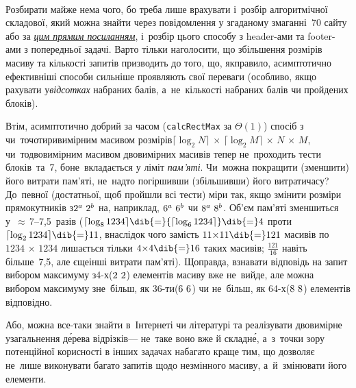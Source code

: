 ~

\smallskip

\vspace{-\baselineskip}

\Tutorial
Розбирати майже нема чого, бо треба лише врахувати і~розбір алгоритмічної складової, який можна знайти через повідомлення у згаданому змаганні~70 сайту \EjudgeCkipoName{} або за \href{https://ejudge.ckipo.edu.ua/coll_new_A4_11pt.pdf#page=110}{\emph{цим прямим посиланням}}, і~розбір цього способу з header-ами та footer-ами з попередньої задачі.
Варто тільки наголосити, що збільшення розмірів масиву та кількості запитів призводить до того, що, як\nolinebreak[3] правило, асимптотично ефективніші способи сильніше проявляють свої переваги (особливо, якщо рахувати у\nolinebreak[2] \emph{відсотках} набраних балів, а~не~кількості набраних балів чи пройдених блоків).

Втім, асимптотично добрий за часом (\texttt{calcRectMax} за $\Theta(1)$) спосіб з чи~то\nolinebreak[2] чотиривимірним масивом розмірів\nolinebreak[2] ${\lceil\log_2{N}\rceil\,{\times}\,\lceil\log_2{M}\rceil\,{\times}\,N\,{\times}\,M}$, чи~то\nolinebreak[2] двовимірним масивом двовимірних масивів тепер не~проходить тести блоків~та~7, бо\nolinebreak[3] не~вкладається у ліміт \emph{пам'яті}. Чи~можна покращити (зменшити) його витрати пам'яті, не~надто погіршивши (збільшивши) його витрати\nolinebreak[2] часу? До~певної (достатньої, щоб пройшли всі тести) міри так, якщо змінити розміри прямокутників з\nolinebreak[2] ${2^a\,{\*}\,2^b}$ на, наприклад, ${6^a\,{\*}\,6^b}$ чи ${8^a\,{\*}\,8^b}$. 
Об'єм пам'яті зменшиться у~${\approx}\,$\mbox{7--7,5}~разів 
(${\lceil\log_8{1234}\rceil}\dib{{=}}{\lceil\log_6{1234}\rceil}\dib{{=}}4$ проти ${\lceil\log_2{1234}\rceil}\dib{{=}}11$, внаслідок чого замість ${11{\times}11}\dib{{=}}121$ масивів по ${1234\,{\times}\,1234}$ лишається тільки ${4{\times}4}\dib{{=}}16$ таких масивів; $\frac{121}{16}$ навіть більше~7,5, але 
є\nolinebreak[3] ще\nolinebreak[3] інші витрати пам'яті).
Щоправда, взнавати відповідь на запит вибором максимуму з\nolinebreak[3] \mbox{4-х}\nolinebreak[2] (${2\,{\*}\,2}$) елементів масиву вже не~вийде, але можна вибором максимуму з\nolinebreak[3] не~більш, як \mbox{36-ти}\nolinebreak[2] (${6\,{\*}\,6}$) чи не~більш, як \mbox{64-х}\nolinebreak[2] (${8\,{\*}\,8}$) елементів відповідно. 

Або, можна все-таки знайти в~Інтернеті чи літературі та реалізувати двовимірне узагальнення д\'{е}рева відрізків\nolinebreak[3] --- не~таке воно вже й складн\'{е}, а~з~точки зору потенційної корисності в інших задачах набагато краще тим, що дозволяє не~лише виконувати багато запитів щодо незмін\-ного масиву, а~й~змінювати його елементи.

